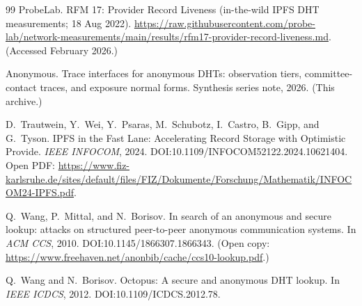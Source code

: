 \documentclass[11pt]{article}
\begin{document}
\begin{thebibliography}{99}
ProbeLab.
\newblock RFM 17: Provider Record Liveness (in-the-wild IPFS DHT measurements; 18 Aug 2022).
\newblock \url{https://raw.githubusercontent.com/probe-lab/network-measurements/main/results/rfm17-provider-record-liveness.md}. (Accessed February 2026.)

Anonymous.
\newblock Trace interfaces for anonymous DHTs: observation tiers, committee-contact traces, and exposure normal forms.
\newblock Synthesis series note, 2026. (This archive.)

D.~Trautwein, Y.~Wei, Y.~Psaras, M.~Schubotz, I.~Castro, B.~Gipp, and G.~Tyson.
\newblock IPFS in the Fast Lane: Accelerating Record Storage with Optimistic Provide.
\newblock \emph{IEEE INFOCOM}, 2024.
\newblock DOI:10.1109/INFOCOM52122.2024.10621404.
\newblock Open PDF: \url{https://www.fiz-karlsruhe.de/sites/default/files/FIZ/Dokumente/Forschung/Mathematik/INFOCOM24-IPFS.pdf}.

Q.~Wang, P.~Mittal, and N.~Borisov.
\newblock In search of an anonymous and secure lookup: attacks on structured peer-to-peer anonymous communication systems.
\newblock In \emph{ACM CCS}, 2010.
\newblock DOI:10.1145/1866307.1866343. (Open copy: \url{https://www.freehaven.net/anonbib/cache/ccs10-lookup.pdf}.)

Q.~Wang and N.~Borisov.
\newblock Octopus: A secure and anonymous DHT lookup.
\newblock In \emph{IEEE ICDCS}, 2012.
\newblock DOI:10.1109/ICDCS.2012.78.

\end{thebibliography}
\end{document}
